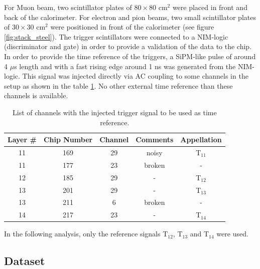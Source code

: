 \documentclass[twoside,a4paper,11pt]{article}
\begin{document}
For Muon beam, two scintillator plates of $80\times80$ cm$^2$ were placed in front and back of the calorimeter. For electron and pion beams, two small scintillator plates of $30\times30$ cm$^2$ were positioned in front of the calorimeter (see figure \ref{fig:stack_steel}). The trigger scintillators were connected to a NIM-logic (discriminator and gate) in order to provide a validation of the data to the chip. 
In order to provide the time reference of the triggers, a SiPM-like pulse of around 4 $\mu$s length and with a fast rising edge around 1 ns was generated from the NIM-logic. This signal was injected directly via AC coupling to some channels in the setup as shown in the table \ref{table:trigger_signal_list}. No other external time reference than these channels is available.
\begin{table}[htbp]
\centering
  \begin{tabular}{@{} ccccc @{}}
    \hline
    Layer \# & Chip Number & Channel & Comments & Appellation \\ 
    \hline
    11 & 169 & 29 & noisy & T$_{11}$ \\ 
    11 & 177 & 23 & broken & - \\
    12 & 185 & 29 & - & T$_{12}$ \\ 
    13 & 201 & 29 & -  & T$_{13}$ \\
    13 & 211 & 6 & broken & - \\ 
    14 & 217 & 23 & - & T$_{14}$ \\
    \hline
  \end{tabular}
  \caption{List of channels with the injected trigger signal to be used as time reference.}
  \label{table:trigger_signal_list}
\end{table}
In the following analysis, only the reference signals T$_{12}$,  T$_{13}$ and T$_{14}$ were used.

\subsection{Dataset}
\label{subsec:dataset}
\end{document}

